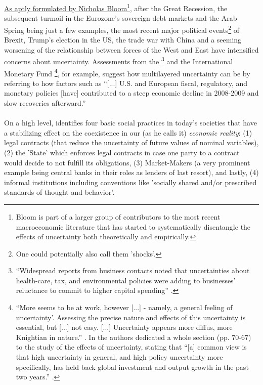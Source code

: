 \documentclass[a4paper,11pt,listof=nochaptergap,oneside,pointednumbers,bibtotoc,bigheadings,liststotoc,hidelinks]{scrbook}
\theoremstyle{mysatz}
\theoremstyle{mydefinition}
\theoremstyle{mytheorem}
\theoremstyle{mybemerkung}
\begin{document}
\href{https://site.stanford.edu/2018/session-6}{As aptly formulated by Nicholas Bloom}\footnote{Bloom is part of a larger group of contributors to the most recent macroeconomic literature that has started to systematically disentangle the effects of uncertainty both theoretically and empirically.}, after the Great Recession, the subsequent turmoil in the Eurozone's sovereign debt markets and the Arab Spring being just a few examples, the most recent major political events\footnote{One could potentially also call them 'shocks'.} of Brexit, Trump's election in the US,  the trade war with China and a seeming worsening of the relationship between forces of the West and East have intensified concerns about uncertainty. Assessments from the 
\citet{FOMC:09}\footnote{``Widespread reports from business contacts noted that uncertainties about health-care, tax, and environmental policies were adding to businesses' reluctance to commit to higher capital spending'' \citep{FOMC:09}.} and the International Monetary Fund \citep{IMF:12, IMF:13}\footnote{``More seems to be at work, however [...] - namely, a general feeling of uncertainty'. Assessing the precise nature and effects of this uncertainty is essential, but [...] not easy. [...] Uncertainty appears more diffus, more Knightian in nature.'' \citep{IMF:12}. In \citet{IMF:13} the authors dedicated a whole section (pp. 70-67) to the study of the effects of uncertainty, stating that ``[a] common view is that high uncertainty in general, and high policy uncertainty more specifically, has held back global investment and output growth in the past two years.'' \citep[p. 70]{IMF:13}.}, for example, suggest how multilayered uncertainty can be by referring to how factors such as ``[...] U.S. and European fiscal, regulatory, and monetary policies [have] contributed to a steep economic decline in 2008-2009 and slow recoveries afterward.'' \citep[p.1594]{bakeretal:15}\\
\\
On a high level, \citet{dequesh:00} identifies four basic social practices in today's societies that have a stabilizing effect on the coexistence in our (as  he calls it) \textit{economic reality}: (1) legal contracts (that reduce the uncertainty of future values of nominal variables), (2) the 'State' which enforces legal contracts in case one party to a contract would decide to not fulfill its obligations, (3) Market-Makers (a very prominent example being central banks in their roles as lenders of last resort), and lastly, (4) informal institutions including conventions like 'socially shared and/or prescribed standards of thought and behavior'. \\
\end{document}
